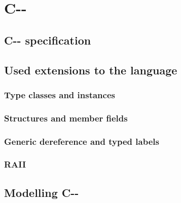 \chapter{C-{}-}


\section{C-{}- specification}


\section{Used extensions to the language}


\subsection{Type classes and instances}

\subsection{Structures and member fields}


\subsection{Generic dereference and typed labels}

\subsection{RAII}


\section{Modelling C-{}-}

